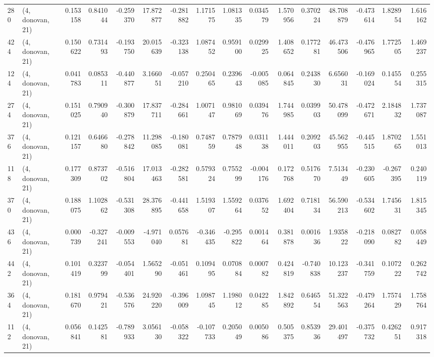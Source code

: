 \begin{tabular}{llrrrrrrrrrrrrrr}
280 &  (4, donovan, 21) &   0.153158 &  0.841044 & -0.259370 &  17.872877 & -0.281882 &   1.171575 &  1.081335 &  0.034579 &  1.570956 &  0.370224 &    48.708879 &  -0.473614 &   1.828954 &   1.616162 \\
424 &  (4, donovan, 21) &   0.150622 &  0.731493 & -0.193750 &  20.015639 & -0.323138 &   1.087452 &  0.959100 &  0.029925 &  1.408652 &  0.177281 &    46.473506 &  -0.476965 &   1.772505 &   1.469237 \\
124 &  (4, donovan, 21) &   0.041783 &  0.085311 & -0.440877 &   3.166051 & -0.057210 &   0.250465 &  0.239643 & -0.005085 &  0.064845 &  0.243830 &     6.656031 &  -0.169024 &   0.145554 &   0.255315 \\
274 &  (4, donovan, 21) &   0.151025 &  0.790940 & -0.300879 &  17.837711 & -0.284661 &   1.007147 &  0.981069 &  0.039476 &  1.744985 &  0.039903 &    50.478099 &  -0.472671 &   2.184832 &   1.737087 \\
376 &  (4, donovan, 21) &   0.121157 &  0.646680 & -0.278842 &  11.298085 & -0.180081 &   0.748759 &  0.787948 &  0.031138 &  1.444011 &  0.209203 &    45.562955 &  -0.445515 &   1.870265 &   1.551013 \\
118 &  (4, donovan, 21) &   0.177309 &  0.873702 & -0.516804 &  17.013463 & -0.282581 &   0.579324 &  0.755299 & -0.004176 &  0.172768 &  0.517670 &     7.513449 &  -0.230605 &  -0.267395 &   0.240119 \\
370 &  (4, donovan, 21) &   0.188075 &  1.102862 & -0.531308 &  28.376895 & -0.441658 &   1.519307 &  1.559264 &  0.037652 &  1.692404 &  0.718134 &    56.590213 &  -0.534602 &   1.745631 &   1.815345 \\
436 &  (4, donovan, 21) &   0.000739 & -0.327241 & -0.009553 &  -4.971040 &  0.057681 &  -0.346435 & -0.295822 &  0.001464 &  0.381878 &  0.001636 &     1.935822 &  -0.218090 &   0.082782 &   0.058449 \\
442 &  (4, donovan, 21) &   0.101419 &  0.323799 & -0.054401 &   1.565290 & -0.051461 &   0.109495 &  0.070884 &  0.000782 &  0.424819 & -0.740838 &    10.123237 &  -0.341759 &   0.107222 &   0.262742 \\
364 &  (4, donovan, 21) &   0.181670 &  0.979421 & -0.536576 &  24.920220 & -0.396009 &   1.098745 &  1.198012 &  0.042285 &  1.842892 &  0.646554 &    51.322563 &  -0.479264 &   1.757429 &   1.758764 \\
112 &  (4, donovan, 21) &   0.056841 &  0.142581 & -0.789933 &   3.056130 & -0.058322 &  -0.107733 &  0.205049 &  0.005086 &  0.505375 &  0.853936 &    29.401497 &  -0.375732 &   0.426251 &   0.917318 \\

\end{tabular}
